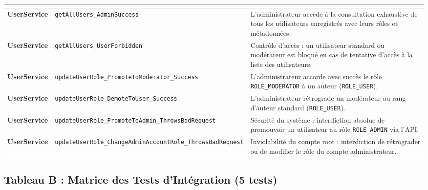 \documentclass[11pt,a4paper]{article}
\newcommand{\testmethod}[1]{{\ttfamily\scriptsize\nolinkurl{#1}}}
\begin{document}
\begin{longtable}{|>{\raggedright\arraybackslash\bfseries}p{2.7cm}|>{\raggedright\arraybackslash}p{4.8cm}|>{\raggedright\arraybackslash}p{7.2cm}|}
\multicolumn{3}{|l|}{\cellcolor{gray!20}\textbf{5. Service d'administration des utilisateurs (\texttt{UserServiceTest} - 6 tests)}} \\
\hline
UserService & \testmethod{getAllUsers_AdminSuccess} & L'administrateur accède à la consultation exhaustive de tous les utilisateurs enregistrés avec leurs rôles et métadonnées. \\
\hline
UserService & \testmethod{getAllUsers_UserForbidden} & Contrôle d'accès : un utilisateur standard ou modérateur est bloqué en cas de tentative d'accès à la liste des utilisateurs. \\
\hline
UserService & \testmethod{updateUserRole_PromoteToModerator_Success} & L'administrateur accorde avec succès le rôle \texttt{ROLE\_MODERATOR} à un auteur (\texttt{ROLE\_USER}). \\
\hline
UserService & \testmethod{updateUserRole_DemoteToUser_Success} & L'administrateur rétrograde un modérateur au rang d'auteur standard (\texttt{ROLE\_USER}). \\
\hline
UserService & \testmethod{updateUserRole_PromoteToAdmin_ThrowsBadRequest} & Sécurité du système : interdiction absolue de promouvoir un utilisateur au rôle \texttt{ROLE\_ADMIN} via l'API. \\
\hline
UserService & \testmethod{updateUserRole_ChangeAdminAccountRole_ThrowsBadRequest} & Inviolabilité du compte root : interdiction de rétrograder ou de modifier le rôle du compte administrateur. \\
\end{longtable}
\endgroup

\newpage
\subsection*{Tableau B : Matrice des Tests d'Intégration (5 tests)}
\end{document}
